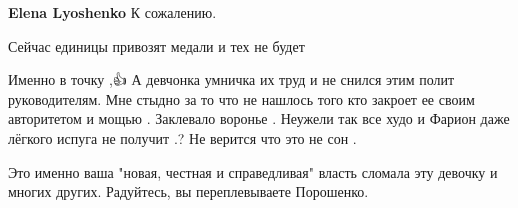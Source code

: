 \begin{itemize}
\begin{itemize}
\textbf{Elena Lyoshenko} К сожалению.
\end{itemize}

 
Сейчас единицы привозят медали и тех не будет

 

Именно в точку ,👍 А девчонка умничка их труд и не снился этим полит
руководителям. Мне стыдно за то что не нашлось того кто закроет ее своим
авторитетом и мощью . Заклевало воронье . Неужели так все худо и Фарион даже
лёгкого испуга не получит .? Не верится что это не сон .


 

Это именно ваша "новая, честная и справедливая" власть сломала эту девочку и
многих других. Радуйтесь, вы переплевываете Порошенко.


\end{itemize}

